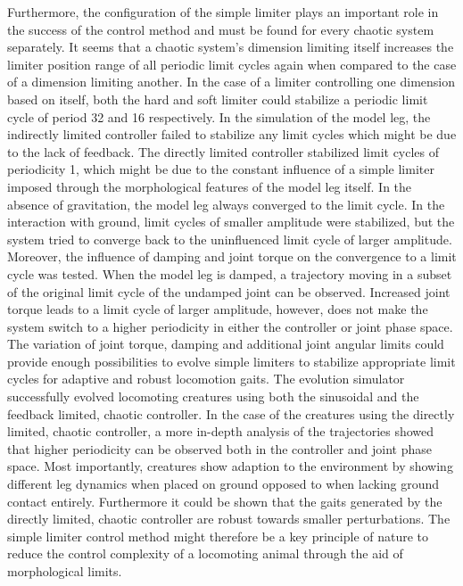 \documentclass[11pt, a4paper, oneside]{Thesis} %
\begin{document}
{%
Furthermore, the configuration of the simple limiter plays an important role in the success of the control method and must be found for every chaotic system separately. %
%
It seems that a chaotic system's dimension limiting itself increases the limiter position range of all periodic limit cycles again when compared to the case of a dimension limiting another. %
%
In the case of a limiter controlling one dimension based on itself, both the hard and soft limiter could stabilize a periodic limit cycle of period 32 and 16 respectively. %
%
In the simulation of the model leg, the indirectly limited controller failed to stabilize any limit cycles which might be due to the lack of feedback. %
%
The directly limited controller stabilized limit cycles of periodicity 1, which might be due to the constant influence of a simple limiter imposed through the morphological features of the model leg itself. %
%
In the absence of gravitation, the model leg always converged to the limit cycle. %
%
In the interaction with ground, limit cycles of smaller amplitude were stabilized, but the system tried to converge back to the uninfluenced limit cycle of larger amplitude. %
%
Moreover, the influence of damping and joint torque on the convergence to a limit cycle was tested. %
%
When the model leg is damped, a trajectory moving in a subset of the original limit cycle of the undamped joint can be observed. %
%
Increased joint torque leads to a limit cycle of larger amplitude, however, does not make the system switch to a higher periodicity in either the controller or joint phase space. %
%
The variation of joint torque, damping and additional joint angular limits could provide enough possibilities to evolve simple limiters to stabilize appropriate limit cycles for adaptive and robust locomotion gaits. %
%
The evolution simulator successfully evolved locomoting creatures using both the sinusoidal and the feedback limited, chaotic controller. %
%
In the case of the creatures using the directly limited, chaotic controller, a more in-depth analysis of the trajectories showed that higher periodicity can be observed both in the controller and joint phase space. %
%
Most importantly, creatures show adaption to the environment by showing different leg dynamics when placed on ground opposed to when lacking ground contact entirely. %
%
Furthermore it could be shown that the gaits generated by the directly limited, chaotic controller are robust towards smaller perturbations. %
%
The simple limiter control method might therefore be a key principle of nature to reduce the control complexity of a locomoting animal through the aid of morphological limits. %
%

}
\end{document}
